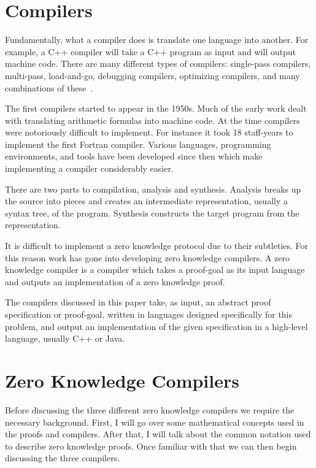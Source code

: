\documentclass{sig-alternate}
\begin{document}
\section{Compilers}
	Fundamentally, what a compiler does is translate one language into
	another. For example, a C++ compiler will take a C++ program as input and
	will output machine code. There are many different types of
	compilers: single-pass compilers, multi-pass, load-and-go, debugging compilers,
	optimizing compilers, and many combinations of these~\cite{Compiler:1986}.
	
	The first compilers started to appear in the 1950s. Much of the early work
	dealt with translating arithmetic formulas into machine code. At the time
	compilers were notoriously difficult to implement. For instance it took
	18 staff-years to implement the first Fortran compiler. Various languages,
	programming	environments, and tools have been developed since then which
	make implementing a compiler considerably easier.
	
	There are two parts to compilation, analysis and synthesis. Analysis breaks
	up the source into pieces and creates an intermediate representation, usually
	a syntax tree, of the program. Synthesis constructs the target program from
    the representation.
    
    It is difficult to implement a zero knowledge protocol due to their
	subtleties. For this reason work has gone into
	developing zero knowledge compilers. A zero knowledge compiler is a
	compiler which takes a proof-goal as its input language
	and outputs an implementation of a zero knowledge proof.
    
    The compilers discussed in this paper take, as input, an abstract proof 
    specification or proof-goal, written in languages designed specifically 
    for this problem, and output an implementation of the given specification in
    a high-level language, usually C++ or Java.
    
    
\section{Zero Knowledge Compilers}
	Before discussing the three different zero knowledge compilers we
	require the necessary background. First, I will go over some
	mathematical concepts used in the proofs and compilers.
	After that, I will talk about the common notation used to describe
	zero knowledge proofs. Once familiar with that we can then begin
	discussing the three compilers.
	
\end{document}
